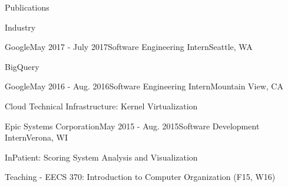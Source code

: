 \documentclass{resume} %
\begin{document}
\begin{rSection}{Publications}


\end{rSection}


\begin{rSection}{Industry}

\begin{rSubsection}{Google}{May 2017 - July 2017}{Software Engineering
Intern}{Seattle, WA}
\item BigQuery
\end{rSubsection}

\begin{rSubsection}{Google}{May 2016 - Aug. 2016}{Software Engineering
Intern}{Mountain View, CA}
\item Cloud Technical Infrastructure: Kernel Virtualization
\end{rSubsection}

\begin{rSubsection}{Epic Systems Corporation}{May 2015 - Aug. 2015}{Software
Development Intern}{Verona, WI}
\item InPatient: Scoring System Analysis and Visualization
\end{rSubsection}
\end{rSection}

\begin{rSection}{Teaching}
- EECS 370: Introduction to Computer Organization (F15, W16)
\end{rSection}
\end{document}
